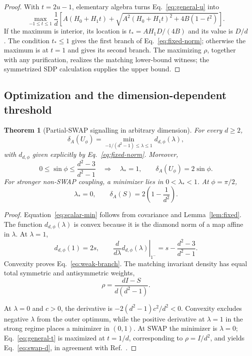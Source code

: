 \documentclass[11pt,a4paper]{article}
\newtheorem{theorem}{Theorem}
\theoremstyle{remark}
\begin{document}
\begin{proof}
With $t=2u-1$, elementary algebra turns Eq.~\eqref{eq:general-u} into
\begin{equation}
 \max_{-1\leq t\leq1}\frac1d\left[
 A(H_0+H_1t)
 +\sqrt{A^2(H_0+H_1t)^2+4B(1-t^2)}
 \right].
 \label{eq:general-t}
\end{equation}
If the maximum is interior, its location is
$t_*=AH_1D/(4B)$ and its value is $D/d$.  The condition $t_*\leq1$ gives the
first branch of Eq.~\eqref{eq:fixed-norm}; otherwise the maximum is at $t=1$
and gives its second branch.  The maximizing $\rho$, together with any
purification, realizes the matching lower-bound witness; the symmetrized SDP
calculation supplies the upper bound.
\end{proof}

\subsection{Optimization and the dimension-dependent threshold}

\begin{theorem}[Partial-SWAP signalling in arbitrary dimension]
\label{thm:partial-swap}
For every $d\geq2$,
\begin{equation}
 \delta_A(U_\phi)
 =\min_{-1/(d^2-1)\leq\lambda\leq1}d_{d,\phi}(\lambda),
 \label{eq:scalar-min}
\end{equation}
with $d_{d,\phi}$ given explicitly by Eq.~\eqref{eq:fixed-norm}.  Moreover,
\begin{equation}
 0\leq\sin\phi\leq\frac{d^2-3}{d^2-1}
 \quad\Longrightarrow\quad
 \lambda_*=1,\qquad
 \delta_A(U_\phi)=2\sin\phi.
 \label{eq:weak-branch}
\end{equation}
For stronger non-SWAP coupling, a minimizer lies in $0<\lambda_*<1$.
At $\phi=\pi/2$,
\begin{equation}
 \lambda_*=0,\qquad
 \delta_A(S)=2\left(1-\frac1{d^2}\right).
 \label{eq:swap-d}
\end{equation}
\end{theorem}

\begin{proof}
Equation~\eqref{eq:scalar-min} follows from covariance and
Lemma~\ref{lem:fixed}.  The function $d_{d,\phi}(\lambda)$ is convex because it
is the diamond norm of a map affine in $\lambda$.  At $\lambda=1$,
\[
 d_{d,\phi}(1)=2s,\qquad
 \left.\frac{d}{d\lambda}d_{d,\phi}(\lambda)\right|_{1^-}
 =s-\frac{d^2-3}{d^2-1}.
\]
Convexity proves Eq.~\eqref{eq:weak-branch}.  The matching invariant density
has equal total symmetric and antisymmetric weights,
\[
 \rho=\frac{dI-S}{d(d^2-1)}.
\]

At $\lambda=0$ and $c>0$, the derivative is
$-2(d^2-1)c^2/d^2<0$.  Convexity excludes negative $\lambda$ from the outer
optimum, while the positive derivative at $\lambda=1$ in the strong regime
places a minimizer in $(0,1)$.  At SWAP the minimizer is $\lambda=0$;
Eq.~\eqref{eq:general-t} is maximized at $t=1/d$, corresponding to
$\rho=I/d^2$, and yields Eq.~\eqref{eq:swap-d}, in agreement with
Ref.~\cite{barsse2025}.
\end{proof}
\end{document}
